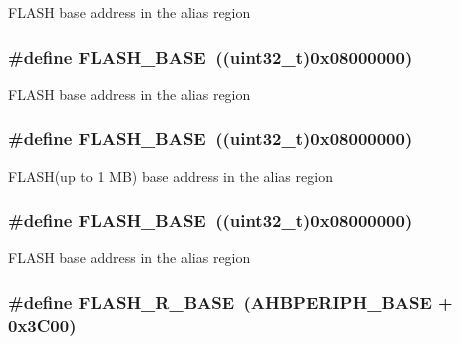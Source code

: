F\-L\-A\-S\-H base address in the alias region \hypertarget{group___peripheral__memory__map_ga23a9099a5f8fc9c6e253c0eecb2be8db}{
\subsubsection[{F\-L\-A\-S\-H\-\_\-\-B\-A\-S\-E}]{\setlength{\rightskip}{0pt plus 5cm}\#define F\-L\-A\-S\-H\-\_\-\-B\-A\-S\-E~((uint32\-\_\-t)0x08000000)}}\label{group___peripheral__memory__map_ga23a9099a5f8fc9c6e253c0eecb2be8db}
F\-L\-A\-S\-H base address in the alias region \hypertarget{group___peripheral__memory__map_ga23a9099a5f8fc9c6e253c0eecb2be8db}{
\subsubsection[{F\-L\-A\-S\-H\-\_\-\-B\-A\-S\-E}]{\setlength{\rightskip}{0pt plus 5cm}\#define F\-L\-A\-S\-H\-\_\-\-B\-A\-S\-E~((uint32\-\_\-t)0x08000000)}}\label{group___peripheral__memory__map_ga23a9099a5f8fc9c6e253c0eecb2be8db}
F\-L\-A\-S\-H(up to 1 M\-B) base address in the alias region \hypertarget{group___peripheral__memory__map_ga23a9099a5f8fc9c6e253c0eecb2be8db}{
\subsubsection[{F\-L\-A\-S\-H\-\_\-\-B\-A\-S\-E}]{\setlength{\rightskip}{0pt plus 5cm}\#define F\-L\-A\-S\-H\-\_\-\-B\-A\-S\-E~((uint32\-\_\-t)0x08000000)}}\label{group___peripheral__memory__map_ga23a9099a5f8fc9c6e253c0eecb2be8db}
F\-L\-A\-S\-H base address in the alias region \hypertarget{group___peripheral__memory__map_ga8e21f4845015730c5731763169ec0e9b}{
\subsubsection[{F\-L\-A\-S\-H\-\_\-\-R\-\_\-\-B\-A\-S\-E}]{\setlength{\rightskip}{0pt plus 5cm}\#define F\-L\-A\-S\-H\-\_\-\-R\-\_\-\-B\-A\-S\-E~(A\-H\-B\-P\-E\-R\-I\-P\-H\-\_\-\-B\-A\-S\-E + 0x3\-C00)}}\label{group___peripheral__memory__map_ga8e21f4845015730c5731763169ec0e9b}
